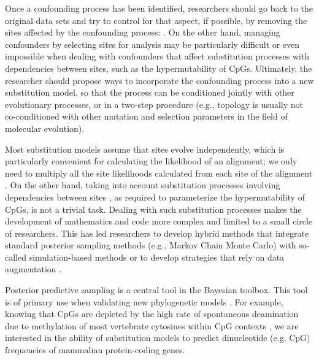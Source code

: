 \documentclass{article}
\begin{document}
Once a confounding process has been identified, researchers should go back to the original data sets and try to control for that aspect, if possible, by removing the sites affected by the confounding process: \citep[e.g.,][]{Dunn2019}.  On the other hand, managing confounders by selecting sites for analysis may be particularly difficult or even impossible when dealing with confounders that affect substitution processes with dependencies between sites, such as the hypermutability of CpGs.  Ultimately, the researcher should propose ways to incorporate the confounding process into a new substitution model, so that the process can be conditioned jointly with other evolutionary processes, or in a two-step procedure (e.g., topology is usually not co-conditioned with other mutation and selection parameters in the field of molecular evolution).

Most substitution models assume that sites evolve independently, which is particularly convenient for calculating the likelihood of an alignment; we only need to multiply all the site likelihoods calculated from each site of the alignment \citep{Felsenstein1981}.  On the other hand, taking into account substitution processes involving dependencies between sites \citep[e.g.,][]{Robinson2003,Rodrigue2005,LaurinLemay2018b,Meyer2019}, as required to parameterize the hypermutability of CpGs, is not a trivial task.  Dealing with such substitution processes makes the development of mathematics and code more complex and limited to a small circle of researchers. This has led researchers to develop hybrid methods that integrate standard posterior sampling methods (e.g., Markov Chain Monte Carlo) with so-called simulation-based methods \citep[e.g.,][]{LaurinLemay2018b} or to develop strategies that rely on data augmentation \citep[e.g.,][]{Robinson2003,Rodrigue2005}.

Posterior predictive sampling \citep{Gelman1996,Brown2018} is a central tool in the Bayesian toolbox. This tool is of primary use when validating new phylogenetic models \citep[e.g.,][]{Huelsenbeck2001,Brown2014}.  For example, knowing that CpGs are depleted by the high rate of spontaneous deamination due to methylation of most vertebrate cytosines within CpG contexts \citep{Bird1980,Burge1992}, we are interested in the ability of substitution models to predict dinucleotide (e.g. CpG) frequencies of mammalian protein-coding genes.
\end{document}
